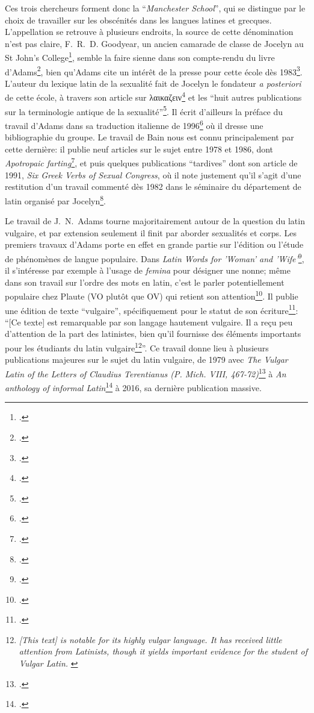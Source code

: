 Ces trois chercheurs forment donc la \enquote{\textit{Manchester School}}, qui se distingue par le choix de travailler sur les obscénités dans les langues latines et grecques. L'appellation se retrouve à plusieurs endroits, la source de cette dénomination n'est pas claire, F.~R.~D. Goodyear, un ancien camarade de classe de Jocelyn au St John's College\footcite[p.~282]{adams_henry_2003}, semble la faire sienne dans son compte-rendu du livre d'Adams\footcite{goodyear_praefanda_1985}, bien qu'Adams cite un intérêt de la presse pour cette école dès 1983\footcite[p.~289]{adams_henry_2003}. L'auteur du lexique latin de la sexualité fait de Jocelyn le fondateur \textit{a posteriori} de cette école, à travers son article sur λαικαζειν\footcite{jocelyn_greek_1980} et les \enquote{huit autres publications sur la terminologie antique de la sexualité}\footcite[p.~290]{adams_henry_2003}. Il écrit d'ailleurs la préface du travail d'Adams dans sa traduction italienne de 1996\footcite{adams1996vocabolario} où il dresse une bibliographie du groupe. Le travail de Bain nous est connu principalement par cette dernière: il publie neuf articles sur le sujet entre 1978 et 1986, dont \textit{Apotropaic farting}\footcite{bain1986apotropaic}, et puis quelques publications \enquote{tardives} dont son article de 1991, \textit{Six Greek Verbs of Sexual Congress}, où il note justement qu'il s'agit d'une restitution d'un travail commenté dès 1982 dans le séminaire du département de latin organisé par Jocelyn\footcite{bain_six_1991}. 

Le travail de J.~N.~Adams tourne majoritairement autour de la question du latin vulgaire, et par extension seulement il finit par aborder sexualités et corps. Les premiers travaux d'Adams porte en effet en grande partie sur l'édition ou l'étude de phénomènes de langue populaire. Dans \textit{Latin Words for 'Woman' and 'Wife'}\footcite{adams1972latin}, il s'intéresse par exemple à l'usage de \textit{femina} pour désigner une nonne; même dans son travail sur l'ordre des mots en latin, c'est le parler potentiellement populaire chez Plaute (VO plutôt que OV) qui retient son attention\footcite[p.~95]{adams_typological_1976}. Il publie une édition de texte \enquote{vulgaire}, spécifiquement pour le statut de son écriture\footcite{adams_text_1976}: \enquote{[Ce texte] est remarquable par son langage hautement vulgaire. Il a reçu peu d'attention de la part des latinistes, bien qu'il fournisse des éléments importants pour les étudiants du latin vulgaire\footnote{\textit{[This text] is notable for its highly vulgar language. It has received little attention from Latinists, though it yields important evidence for the student of Vulgar Latin.} \textcite[p.~2]{adams_text_1976}}}. Ce travail donne lieu à plusieurs publications majeures sur le sujet du latin vulgaire, de 1979 avec \textit{The Vulgar Latin of the Letters of Claudius Terentianus (P. Mich. VIII, 467-72)}\footcite{adams_vulgar_1977} à \textit{An anthology of informal Latin}\footcite{adams2016anthology} à 2016, sa dernière publication massive.

